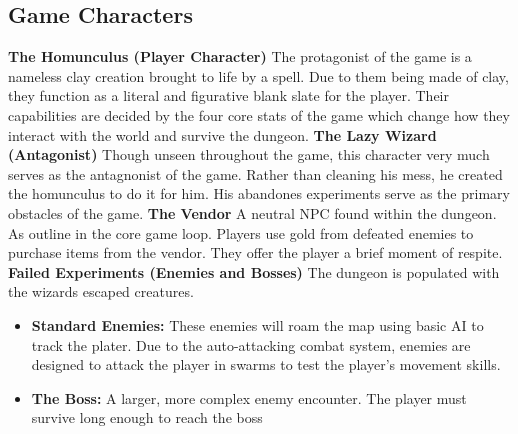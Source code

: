 \documentclass[progress]{cmpreport}
\begin{document}
\subsection{Game Characters}
\textbf{The Homunculus (Player Character)}
\newline
The protagonist of the game is a nameless clay creation brought to life by a spell. Due to them being made of clay, they function as a literal and figurative blank slate for the player.
Their capabilities are decided by the four core stats of the game which change how they interact with the world and survive the dungeon.
\newline
\newline 
\textbf{The Lazy Wizard (Antagonist)}
\newline
Though unseen throughout the game, this character very much serves as the antagnonist of the game. Rather than cleaning his mess, he created the homunculus to do it for him.
His abandones experiments serve as the primary obstacles of the game.
\newline
\newline
\textbf{The Vendor}
\newline
A neutral NPC found within the dungeon. As outline in the core game loop. Players use gold from defeated enemies to purchase items from the vendor. They offer the player
a brief moment of respite.
\newline
\newline
\textbf{Failed Experiments (Enemies and Bosses)}
The dungeon is populated with the wizards escaped creatures.
\begin{itemize}
    \item \textbf{Standard Enemies:} These enemies will roam the map using basic AI to track the plater. Due to the auto-attacking combat system, enemies are designed to attack the player in swarms to 
    test the player's movement skills.
    \item \textbf{The Boss:} A larger, more complex enemy encounter. The player must survive long enough to reach the boss 
\end{itemize}
\end{document}
